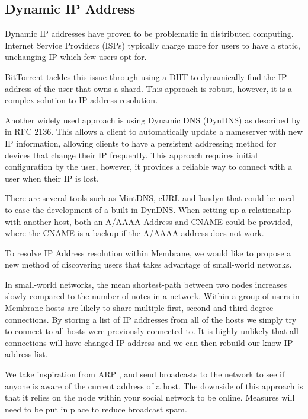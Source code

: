 \documentclass[11pt, a4paper, twoside]{report}
\begin{document}
\subsection{Dynamic IP Address}

Dynamic IP addresses have proven to be problematic in distributed computing. Internet Service Providers (ISPs) typically charge more for users to have a static, unchanging IP which few users opt for.

BitTorrent tackles this issue through using a DHT to dynamically find the IP address of the user that owns a shard. This approach is robust, however, it is a complex solution to IP address resolution.

Another widely used approach is using Dynamic DNS (DynDNS) as described by \cite{bound1997dynamic} in RFC 2136. This allows a client to automatically update a nameserver with new IP information, allowing clients to have a persistent addressing method for devices that change their IP frequently. This approach requires initial configuration by the user, however, it provides a reliable way to connect with a user when their IP is lost.

There are several tools such as MintDNS, cURL and Iandyn that could be used to ease the development of a built in DynDNS. When setting up a relationship with another host, both an A/AAAA Address and CNAME could be provided, where the CNAME is a backup if the A/AAAA address does not work.

To resolve IP Address resolution within Membrane, we would like to propose a new method of discovering users that takes advantage of small-world networks. \citep{porter2012small}

In small-world networks, the mean shortest-path between two nodes increases slowly compared to the number of notes in a network. Within a group of users in Membrane hosts are likely to share multiple first, second and third degree connections. By storing a list of IP addresses from all of the hosts we simply try to connect to all hosts were previously connected to. It is highly unlikely that all connections will have changed IP address and we can then rebuild our know IP address list.

We take inspiration from ARP \citep{plummer1982ethernet}, and send broadcasts to the network to see if anyone is aware of the current address of a host. The downside of this approach is that it relies on the node within your social network to be online. Measures will need to be put in place to reduce broadcast spam.
\end{document}
